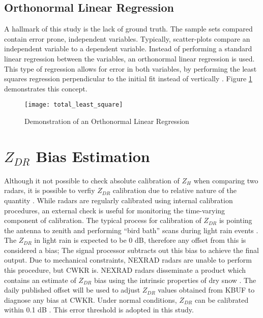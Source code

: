 \subsection{Orthonormal Linear Regression}
A hallmark of this study is the lack of ground truth. The sample sets compared contain error prone, independent variables. Typically, scatter-plots compare
an independent variable to a dependent variable. Instead of performing a standard linear regression between the variables, an orthonormal linear regression
is used. This type of regression allows for error in both variables, by performing the least squares regression perpendicular to the initial fit instead of
vertically \citep{Markovsky2007}. Figure \ref{fig:total_least_squares} demonstrates this concept.
\begin{figure}[H]
\texttt{[image: total\_least\_square]}\centering
\caption{Demonstration of an Orthonormal Linear Regression} 
\label{fig:total_least_squares}
\end{figure}
\section{$Z_{DR}$ Bias Estimation}
Although it not possible to check absolute calibration of $Z_{H}$ when comparing two radars, it is possible to verfiy $Z_{DR}$ calibration due to relative
nature of the quantity \citep{Zrnic2006}. While radars are regularly calibrated using internal calibration procedures, an external check is useful for
monitoring the time-varying component of calibration. The typical process for calibration of $Z_{DR}$ is pointing the antenna to zenith and performing ``bird
bath'' scans during light rain events \citep{Hubbert2006}. The $Z_{DR}$ in light rain is expected to be 0 dB, therefore any offset from this is considered a
bias; The signal processor subtracts out this bias to achieve the final output. Due to mechanical constraints, NEXRAD radars are unable to perform this
procedure, but CWKR is. NEXRAD radars disseminate a product which contains an estimate of $Z_{DR}$ bias using the intrinsic properties of
dry snow \cite{Zittel2015}. The daily published offset will be used to adjust $Z_{DR}$ values obtained from KBUF to diagnose any bias at CWKR. Under normal conditions, $Z_{DR}$ can be calibrated within 0.1 dB \citep{Zrnic2006}. This error threshold is adopted in this study.